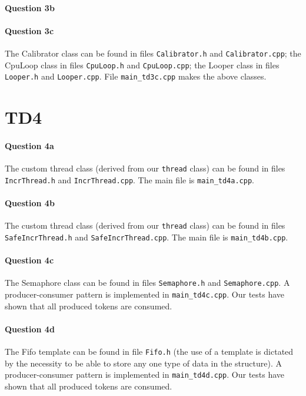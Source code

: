 \documentclass[a4paper,oneside,11pt]{article}
\begin{document}
\paragraph{Question 3b}

\paragraph{Question 3c} The Calibrator class can be found in files \texttt{Calibrator.h} and \texttt{Calibrator.cpp}; the CpuLoop class in files \texttt{CpuLoop.h} and \texttt{CpuLoop.cpp}; the Looper class in files \texttt{Looper.h} and \texttt{Looper.cpp}. File \texttt{main\_td3c.cpp} makes the above classes.

\section*{TD4}
\paragraph{Question 4a} The custom thread class (derived from our \texttt{thread} class) can be found in files \texttt{IncrThread.h} and \texttt{IncrThread.cpp}. The main file is \texttt{main\_td4a.cpp}.

\paragraph{Question 4b} The custom thread class (derived from our \texttt{thread} class) can be found in files \texttt{SafeIncrThread.h} and \texttt{SafeIncrThread.cpp}. The main file is \texttt{main\_td4b.cpp}.

\paragraph{Question 4c} The Semaphore class can be found in files \texttt{Semaphore.h} and \texttt{Semaphore.cpp}. A producer-consumer pattern is implemented in \texttt{main\_td4c.cpp}. Our tests have shown that all produced tokens are consumed.

\paragraph{Question 4d} The Fifo template can be found in file \texttt{Fifo.h} (the use of a template is dictated by the necessity to be able to store any one type of data in the structure). A producer-consumer pattern is implemented in \texttt{main\_td4d.cpp}. Our tests have shown that all produced tokens are consumed.
\end{document}
